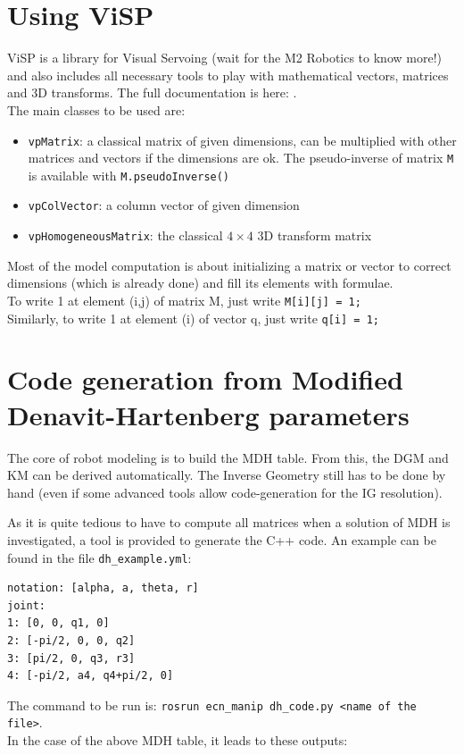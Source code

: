 \documentclass{ecnreport}
\begin{document}
\appendix


\newpage

\section{Using ViSP}\label{visp}

ViSP is a library for Visual Servoing (wait for the M2 Robotics to know more!) and also includes all necessary tools to play with mathematical vectors, matrices and 3D transforms.
The full documentation is here: .\\
The main classes to be used are:
\begin{itemize}
	\item \texttt{vpMatrix}: a classical matrix of given dimensions, can be multiplied with other matrices and vectors if the dimensions are ok. The pseudo-inverse of matrix \texttt{M} 
	is available with \texttt{M.pseudoInverse()}
	\item \texttt{vpColVector}: a column vector of given dimension
	\item \texttt{vpHomogeneousMatrix}: the classical $4\times 4$ 3D transform matrix
\end{itemize}
Most of the model computation is about initializing a matrix or vector to correct dimensions (which is already done) and fill its elements with formulae.\\
To write 1 at element (i,j) of matrix M, just write \texttt{M[i][j] = 1;}\\
Similarly, to write 1 at element (i) of vector q, just write \texttt{q[i] = 1;}


\newpage
\section{Code generation from Modified Denavit-Hartenberg parameters}\label{dhcode}

The core of robot modeling is to build the MDH table. From this, the DGM and KM can be derived automatically. The Inverse Geometry still has to be done by hand (even if some advanced tools allow code-generation for the IG resolution).

As it is quite tedious to have to compute all matrices when a solution of MDH is investigated, a tool is provided to generate the C++ code. An example can be found in the file \texttt{dh\_example.yml}:
\cppstyle
\begin{lstlisting}
notation: [alpha, a, theta, r]
joint:
1: [0, 0, q1, 0]
2: [-pi/2, 0, 0, q2]
3: [pi/2, 0, q3, r3]
4: [-pi/2, a4, q4+pi/2, 0]
\end{lstlisting}
The command to be run is: \texttt{rosrun ecn\_manip dh\_code.py <name of the file>}.\\
In the case of the above MDH table, it leads to these outputs:
\end{document}
